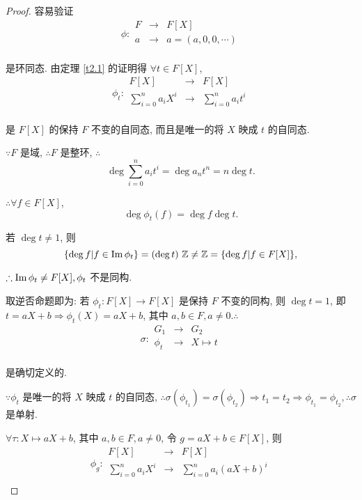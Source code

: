 \documentclass[UTF8]{ctexart}
\begin{document}
\begin{proof}
    容易验证
    \[\phi:\begin{array}{rcl}
        F & \to & F[X] \\
        a & \to & a=(a,0,0,\cdots) \\
    \end{array}\]

    是环同态. 由定理 \ref{t2.1} 的证明得 $\forall t\in F[X]$,
    \[\phi_t:\begin{array}{rcl}
        F[X] & \to & F[X] \\
        \sum\limits_{i=0}^{n}a_iX^i & \to & \sum\limits_{i=0}^{n}a_it^i \\
    \end{array}\]

    是 $F[X]$ 的保持 $F$ 不变的自同态, 而且是唯一的将 $X$ 映成 $t$ 的自同态.

    $\because F$ 是域, $\therefore F$ 是整环, $\therefore$
    \[\deg\sum\limits_{i=0}^{n}a_it^i=\deg a_nt^n=n\deg t.\]

    $\therefore\forall f\in F[X]$,
    \[\deg\phi_t(f)=\deg f\deg t.\]

    若 $\deg t\neq1$, 则
    \[\{\deg f|f\in\im \phi_t\}=(\deg t)\ \mathbb{Z}\neq\mathbb{Z}=\{\deg f|f\in F[X]\},\]

    $\therefore\operatorname{Im} \phi_t\neq F[X],\phi_t$ 不是同构.

    取逆否命题即为: 若 $\phi_t:F[X]\to F[X]$ 是保持 $F$ 不变的同构, 则 $\deg t=1$, 即 $t=aX+b\Rightarrow\phi_t(X)=aX+b$, 其中 $a,b\in F,a\neq0.\therefore$
    \[\sigma:\begin{array}{rcl}
        G_1 & \to & G_2 \\
        \phi_t & \to & X\mapsto t \\
    \end{array}\]

    是确切定义的.

    $\because\phi_t$ 是唯一的将 $X$ 映成 $t$ 的自同态, $\therefore\sigma(\phi_{t_1})=\sigma(\phi_{t_2})\Rightarrow t_1=t_2\Rightarrow\phi_{t_1}=\phi_{t_2},\therefore\sigma$ 是单射.

    $\forall\tau:X\mapsto aX+b$, 其中 $a,b\in F,a\neq0$, 令 $g=aX+b\in F[X]$, 则
    \[\phi_g:\begin{array}{rcl}
        F[X] & \to & F[X] \\
        \sum\limits_{i=0}^{n}a_iX^i & \to & \sum\limits_{i=0}^{n}a_i(aX+b)^i \\
    \end{array}\]


\end{proof}
\end{document}
